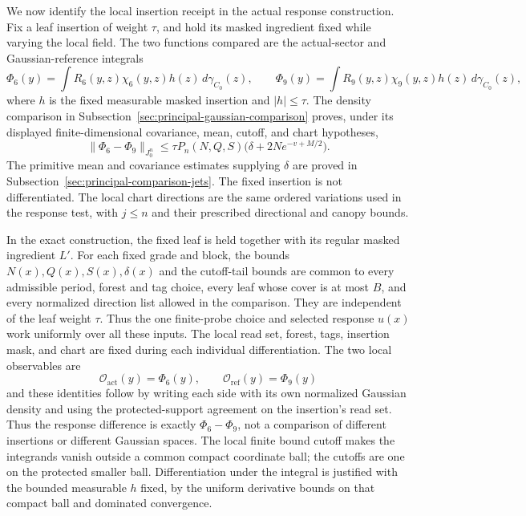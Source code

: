 We now identify the local insertion receipt in the actual response
construction. Fix a leaf insertion of weight $\tau$, and hold its masked
ingredient fixed while varying the local field. The two functions compared
are the actual-sector and Gaussian-reference integrals
\begin{equation}
 \Phi_6(y)=\int R_6(y,z)\chi_6(y,z)h(z)\,d\gamma_{C_0}(z),\qquad
 \Phi_9(y)=\int R_9(y,z)\chi_9(y,z)h(z)\,d\gamma_{C_0}(z),
 \label{eq:ex-lattice-eve-two-integrals}
\end{equation}
where $h$ is the fixed measurable masked insertion and $|h|\le\tau$.
The density comparison in Subsection~\ref{sec:principal-gaussian-comparison}
proves, under its displayed finite-dimensional covariance, mean, cutoff,
and chart hypotheses,
\begin{equation}
 \|\Phi_6-\Phi_9\|_{J^n_0}
 \le \tau P_n(N,Q,S)\bigl(\delta+2N e^{-v+M/2}\bigr).
 \label{eq:ex-lattice-eve-linear-receipt}
\end{equation}
The primitive mean and covariance estimates supplying $\delta$ are proved
in Subsection~\ref{sec:principal-comparison-jets}. The fixed insertion is not
differentiated. The local chart directions are the same ordered variations
used in the response test, with $j\le n$ and their prescribed directional
and canopy bounds.

In the exact construction, the fixed leaf is held together with its regular
masked ingredient $L'$. For each fixed grade and block, the bounds
$N(x),Q(x),S(x),\delta(x)$ and the cutoff-tail bounds are common to every
admissible period, forest and tag choice, every leaf whose cover is at most
$B$, and every normalized direction list allowed in the comparison. They
are independent of the leaf weight $\tau$. Thus the one finite-probe choice
and selected response $u(x)$ work uniformly over all these inputs. The
local read set, forest, tags, insertion mask, and chart are fixed during each
individual differentiation. The two local observables are
\begin{equation}
 \mathcal O_{\mathrm{act}}(y)=\Phi_6(y),\qquad
 \mathcal O_{\mathrm{ref}}(y)=\Phi_9(y)
 \label{eq:ex-lattice-eve-source-identification}
\end{equation}
and these identities follow by writing each side with its own normalized
Gaussian density and using the protected-support agreement on the
insertion's read set. Thus the
response difference is exactly $\Phi_6-\Phi_9$, not a comparison
of different insertions or different Gaussian spaces. The local finite
bound cutoff makes the integrands vanish outside a common compact coordinate
ball; the cutoffs are one on the protected smaller ball. Differentiation
under the integral is justified with the bounded measurable $h$ fixed, by
the uniform derivative bounds on that compact ball and dominated
convergence.

